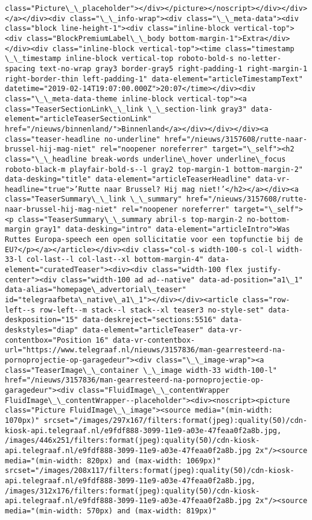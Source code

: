 \documentclass[11pt]{article}
\begin{document}
\begin{Verbatim}[commandchars=\\\{\}]
class="Picture\_\_placeholder"></div></picture></noscript></div></div></a></div><div class="\_\_info-wrap"><div class="\_\_meta-data"><div class="block line-height-1"><div class="inline-block vertical-top"><div class="BlockPremiumLabel\_\_body bottom-margin-1">Extra</div></div><div class="inline-block vertical-top"><time class="timestamp \_\_timestamp inline-block vertical-top roboto-bold-s no-letter-spacing text-no-wrap gray3 border-gray5 right-padding-1 right-margin-1 right-border-thin left-padding-1" data-element="articleTimestampText" datetime="2019-02-14T19:07:00.000Z">20:07</time></div><div class="\_\_meta-data-theme inline-block vertical-top"><a class="TeaserSectionLink\_\_link \_\_section-link gray3" data-element="articleTeaserSectionLink" href="/nieuws/binnenland/">Binnenland</a></div></div></div><a class="teaser-headline no-underline" href="/nieuws/3157608/rutte-naar-brussel-hij-mag-niet" rel="noopener noreferrer" target="\_self"><h2 class="\_\_headline break-words underline\_hover underline\_focus roboto-black-m playfair-bold-s--l gray2 top-margin-1 bottom-margin-2" data-desking="title" data-element="articleTeaserHeadline" data-vr-headline="true">’Rutte naar Brussel? Hij mag niet!’</h2></a></div><a class="TeaserSummary\_\_link \_\_summary" href="/nieuws/3157608/rutte-naar-brussel-hij-mag-niet" rel="noopener noreferrer" target="\_self"><p class="TeaserSummary\_\_summary abril-s top-margin-2 no-bottom-margin gray1" data-desking="intro" data-element="articleIntro">Was Ruttes Europa-speech een open sollicitatie voor een topfunctie bij de EU?</p></a></article></div><div class="col-s width-100-s col-l width-33-l col-last--l col-last--xl bottom-margin-4" data-element="curatedTeaser"><div><div class="width-100 flex justify-center"><div class="width-100 ad ad--native" data-ad-position="a1\_1" data-alias="homepage\_advertorial\_teaser" id="telegraafbeta\_native\_a1\_1"></div></div><article class="row-left--s row-left--m stack--l stack--xl teaser3 no-style-set" data-deskposition="15" data-deskreject="sections:5516" data-deskstyles="diap" data-element="articleTeaser" data-vr-contentbox="Position 16" data-vr-contentbox-url="https://www.telegraaf.nl/nieuws/3157836/man-gearresteerd-na-pornoprojectie-op-garagedeur"><div class="\_\_image-wrap"><a class="TeaserImage\_\_container \_\_image width-33 width-100-l" href="/nieuws/3157836/man-gearresteerd-na-pornoprojectie-op-garagedeur"><div class="FluidImage\_\_contentWrapper FluidImage\_\_contentWrapper--placeholder"><div><noscript><picture class="Picture FluidImage\_\_image"><source media="(min-width: 1070px)" srcset="/images/297x167/filters:format(jpeg):quality(50)/cdn-kiosk-api.telegraaf.nl/e9fdf888-3099-11e9-a03e-47feaa0f2a8b.jpg, /images/446x251/filters:format(jpeg):quality(50)/cdn-kiosk-api.telegraaf.nl/e9fdf888-3099-11e9-a03e-47feaa0f2a8b.jpg 2x"/><source media="(min-width: 820px) and (max-width: 1069px)" srcset="/images/208x117/filters:format(jpeg):quality(50)/cdn-kiosk-api.telegraaf.nl/e9fdf888-3099-11e9-a03e-47feaa0f2a8b.jpg, /images/312x176/filters:format(jpeg):quality(50)/cdn-kiosk-api.telegraaf.nl/e9fdf888-3099-11e9-a03e-47feaa0f2a8b.jpg 2x"/><source media="(min-width: 570px) and (max-width: 819px)" 
\end{Verbatim}
\end{document}
